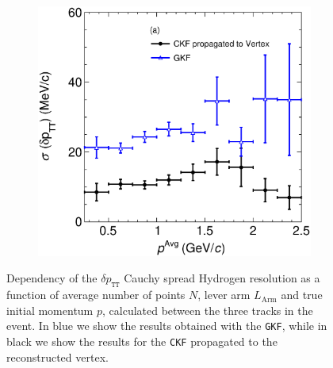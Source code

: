 \begin{figure}[t]
\begin{subfigure}[b]{0.32\textwidth}
         \caption{}
        \label{fig:deltapTTVSAvglArmMC.eps}
     \end{subfigure}
     \begin{subfigure}[b]{0.32\textwidth}
         \centering
         \includegraphics[width=\textwidth]{figures/ch6-TKI/2D/deltapTTVSAvgp.eps}
         \caption{}
         \label{fig:deltapTTVSAvgp.eps}
     \end{subfigure}
        \caption{Dependency of the $\delta p_\texttt{TT}$ Cauchy spread Hydrogen resolution as a function of average number of points $N$, lever arm $L_\text{Arm}$ and true initial momentum $p$, calculated between the three tracks in the event. In blue we show the results obtained with the \texttt{GKF}, while in black we show the results for the \texttt{CKF} propagated to the reconstructed vertex.} \label{fig:dpTTVSAvg}
\end{figure}

